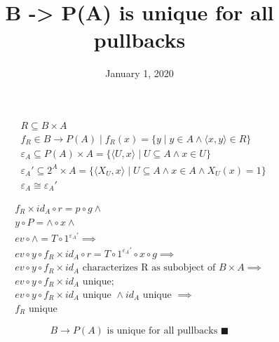 \documentclass[11pt]{article}
\date{January 1, 2020}
\title{B -> P(A) is unique for all pullbacks}
\begin{document}
\begin{multicols}{2}

\columnbreak

\begin{equation*}
\begin{aligned}
& R \subseteq B \times A \\
& f_{R} \in B \rightarrow P(A) \mid f_{R}(x) = 
  \{y \mid y \in A \land \langle x, y \rangle \in R\} \\
& \varepsilon_{A} \subseteq P(A) \times A = 
  \{ \langle U, x \rangle \mid U \subseteq A \land x \in U \} \\
& \varepsilon_{A}' \subseteq 2^{A} \times A =
  \{ \langle X_{U}, x \rangle \mid 
      U \subseteq A \land x \in A \land X_{U}(x) = 1 \} \\
& \varepsilon_{A} \cong \varepsilon_{A}'
\end{aligned}
\end{equation*}

\end{multicols}

\begin{equation*}
\begin{aligned}
& f_{R} \times id_{A} \circ r = p \circ g \land \\
& y \circ P = \wedge \circ x \land \\
& ev \circ \wedge = T \circ 1^{\varepsilon_{A}'} \implies \\
& ev \circ y \circ f_{R} \times id_{A} \circ r =
  T \circ 1^{\varepsilon_{A}'} \circ x \circ g \implies \\
& ev \circ y \circ f_{R} \times id_{A} 
  \text{ characterizes R as subobject of } B \times A \implies \\
& ev \circ y \circ f_{R} \times id_{A} \text{ unique};
& \\
& ev \circ y \circ f_{R} \times id_{A} \text{ unique } \land
  id_{A} \text{ unique } \implies \\
& f_{R} \text{ unique}
\end{aligned}
\end{equation*}

\hrulefill

$$ B \rightarrow P(A) \text{ is unique for all pullbacks }\blacksquare $$
\end{document}
